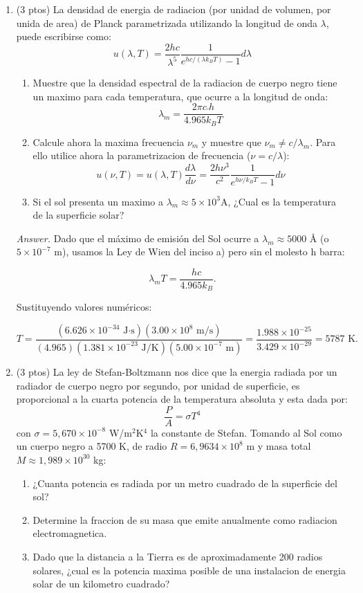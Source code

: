 \documentclass{elsarticle}
\begin{document}
\begin{enumerate}
    \item[4.] (3 ptos) La densidad de energia de radiacion (por unidad de volumen, por unida de area) de Planck parametrizada utilizando la longitud de onda \(\lambda\), puede escribirse como:
    \[
    u(\lambda,T) = \frac{2hc}{\lambda^{5}} \frac{1}{e^{hc/(\lambda k_{B}T)} - 1} d\lambda
    \]
    \begin{enumerate}
        \item Muestre que la densidad espectral de la radiacion de cuerpo negro tiene un maximo para cada temperatura, que ocurre a la longitud de onda:
        \[
        \lambda_{m} = \frac{2\pi c \bar{}h}{4.965k_{B}T}
        \]
        \item Calcule ahora la maxima frecuencia \(\nu_{m}\) y muestre que \(\nu_{m}\neq c/\lambda_{m}\). Para ello utilice ahora la parametrizacion de frecuencia (\(\nu = c/\lambda\)):
        \[
        u(\nu,T) = u(\lambda,T) \frac{d\lambda}{d\nu} = \frac{2h\nu^{3}}{c^{2}} \frac{1}{e^{h\nu/k_{B}T} - 1} d\nu
        \]
        \item Si el sol presenta un maximo a \(\lambda_{m} \approx 5 \times 10^{3}\)A, ¿Cual es la temperatura de la superficie solar?
    \end{enumerate}

\color{purple}\textit{Answer.}\color{black} Dado que el máximo de emisión del Sol ocurre a \( \lambda_m \approx 5000 \) Å (o \( 5 \times 10^{-7} \) m), usamos la Ley de Wien del inciso a) pero sin el molesto h barra:

\[
\lambda_m T = \frac{hc}{4.965 k_B}.
\]

Sustituyendo valores numéricos:

\[
T = \frac{(6.626 \times 10^{-34} \text{ J·s}) (3.00 \times 10^8 \text{ m/s})}{(4.965) (1.381 \times 10^{-23} \text{ J/K}) (5.00 \times 10^{-7} \text{ m})} = \frac{1.988 \times 10^{-25}}{3.429 \times 10^{-29}} = 5787 \text{ K}.
\]

    \item[5.] (3 ptos) La ley de Stefan-Boltzmann nos dice que la energia radiada por un radiador de cuerpo negro por segundo, por unidad de superficie, es proporcional a la cuarta potencia de la temperatura absoluta y esta dada por:
    \[
    \frac{P}{A} = \sigma T^{4}
    \]
    con \(\sigma = 5,670 \times 10^{-8}\) W/m\(^{2}\)K\(^{4}\) la constante de Stefan. Tomando al Sol como un cuerpo negro a 5700 K, de radio \(R = 6,9634 \times 10^{8}\) m y masa total \(M \approx 1,989 \times 10^{30}\) kg:
    \begin{enumerate}
        \item ¿Cuanta potencia es radiada por un metro cuadrado de la superficie del sol?
        \item Determine la fraccion de su masa que emite anualmente como radiacion electromagnetica.
        \item Dado que la distancia a la Tierra es de aproximadamente 200 radios solares, ¿cual es la potencia maxima posible de una instalacion de energia solar de un kilometro cuadrado?
    \end{enumerate}
\end{enumerate}
\end{document}
